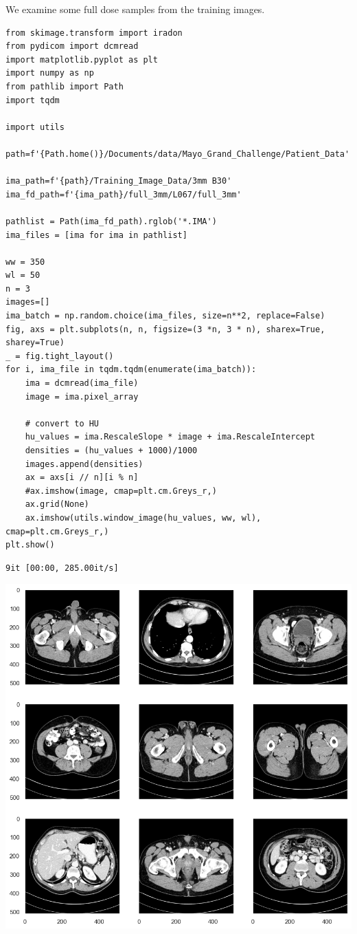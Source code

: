 \documentclass[a4paper, 11pt]{article}
\begin{document}
We examine some full dose samples from the training images.
\begin{verbatim}
from skimage.transform import iradon
from pydicom import dcmread
import matplotlib.pyplot as plt
import numpy as np
from pathlib import Path
import tqdm

import utils

path=f'{Path.home()}/Documents/data/Mayo_Grand_Challenge/Patient_Data'

ima_path=f'{path}/Training_Image_Data/3mm B30'
ima_fd_path=f'{ima_path}/full_3mm/L067/full_3mm'

pathlist = Path(ima_fd_path).rglob('*.IMA')
ima_files = [ima for ima in pathlist]

ww = 350
wl = 50
n = 3
images=[]
ima_batch = np.random.choice(ima_files, size=n**2, replace=False)
fig, axs = plt.subplots(n, n, figsize=(3 *n, 3 * n), sharex=True, sharey=True)
_ = fig.tight_layout()
for i, ima_file in tqdm.tqdm(enumerate(ima_batch)):
    ima = dcmread(ima_file)
    image = ima.pixel_array

    # convert to HU
    hu_values = ima.RescaleSlope * image + ima.RescaleIntercept
    densities = (hu_values + 1000)/1000
    images.append(densities)
    ax = axs[i // n][i % n]
    #ax.imshow(image, cmap=plt.cm.Greys_r,)
    ax.grid(None)
    ax.imshow(utils.window_image(hu_values, ww, wl), cmap=plt.cm.Greys_r,)
plt.show()
\end{verbatim}

\begin{verbatim}
9it [00:00, 285.00it/s]

\end{verbatim}

\begin{center}
\includegraphics[width=.9\linewidth]{./.ob-jupyter/60530960a5453d2cbb849a8caa49c64bf7d7626b.png}
\end{center}
\end{document}

